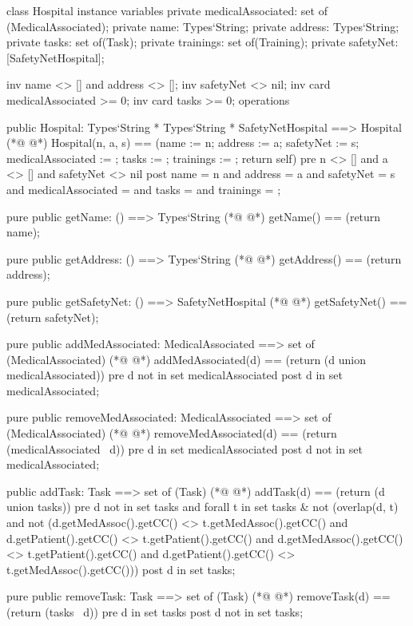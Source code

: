 \begin{vdmpp}[breaklines=true]
class Hospital
instance variables
  private medicalAssociated: set of (MedicalAssociated);
  private name: Types`String;
  private address: Types`String;
  private tasks: set of(Task);
  private trainings: set of(Training);
  private safetyNet: [SafetyNetHospital];
 
 inv name <> [] and address <> [];
 inv safetyNet <> nil; 
 inv card medicalAssociated >= 0;
 inv card tasks >= 0;
operations

 public Hospital: Types`String * Types`String * SafetyNetHospital ==> Hospital
(*@
\label{Hospital:17}
@*)
  Hospital(n, a, s) == (name := n; address := a; safetyNet := s; medicalAssociated := {}; tasks := {}; trainings := {}; return self)
 pre n <> [] and a <> [] and safetyNet <> nil
 post name = n and address = a and safetyNet = s and medicalAssociated = {} and tasks = {} and trainings = {};
 
 pure public getName: () ==> Types`String
(*@
\label{getName:22}
@*)
  getName() == (return name);
 
 pure public getAddress: () ==> Types`String
(*@
\label{getAddress:25}
@*)
  getAddress() == (return address);
  
 pure public getSafetyNet: () ==> SafetyNetHospital
(*@
\label{getSafetyNet:28}
@*)
  getSafetyNet() == (return safetyNet);
 
 pure public addMedAssociated: MedicalAssociated ==> set of (MedicalAssociated)
(*@
\label{addMedAssociated:31}
@*)
  addMedAssociated(d) == (return ({d} union medicalAssociated))
 pre d not in set medicalAssociated
 post d in set medicalAssociated;
  
 pure public removeMedAssociated: MedicalAssociated ==> set of (MedicalAssociated)
(*@
\label{removeMedAssociated:36}
@*)
  removeMedAssociated(d) == (return (medicalAssociated \ {d}))
 pre d in set medicalAssociated
 post d not in set medicalAssociated;
 
 public addTask: Task ==> set of (Task)
(*@
\label{addTask:41}
@*)
  addTask(d) == (return ({d} union tasks))
 pre d not in set tasks and forall t in set tasks & 
  not (overlap(d, t) and not (d.getMedAssoc().getCC() <> t.getMedAssoc().getCC() and 
    d.getPatient().getCC() <> t.getPatient().getCC() and d.getMedAssoc().getCC() <> t.getPatient().getCC()
    and d.getPatient().getCC() <> t.getMedAssoc().getCC()))
 post d in set tasks;
  
 pure public removeTask: Task ==> set of (Task)
(*@
\label{removeTask:49}
@*)
  removeTask(d) == (return (tasks \ {d}))
 pre d in set tasks
 post d not in set tasks;
 

\end{vdmpp}

